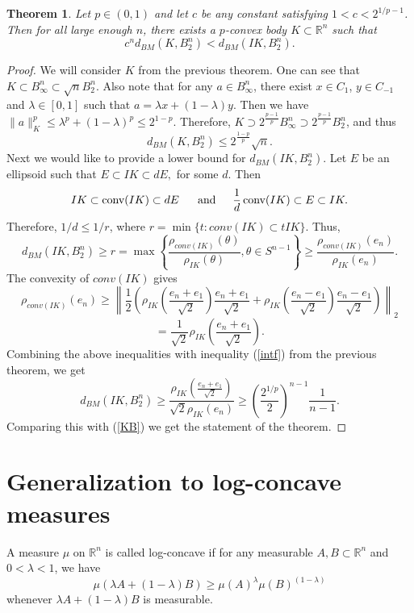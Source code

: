 \documentclass[12pt]{amsart} %
\newtheorem{theorem}{Theorem}
\renewcommand{\[}{\left[}
\renewcommand{\(}{\left(}
\renewcommand{\]}{\right]}
\renewcommand{\)}{\right)}
\newcommand{\conv}{\mathop{\textup{conv}}}
\renewcommand{\le}{\leqslant}
\renewcommand{\ge}{\geqslant}
\begin{document}
\begin{theorem}
Let $p\in (0,1)$ and let $c$ be any constant satisfying $1<c< {2^{1/p-1}}$.  Then for all large enough $n$, there exists a $p$-convex body $K\subset \mathbb R^n$ such that
$$c^n d_{BM}(K, B_2^n)  <  d_{BM} (IK, B_2^n).$$

\end{theorem}
\begin{proof}  We will consider $K$ from the previous theorem.  One can see that $K \subset B_\infty ^n \subset \sqrt{n}B_2^n$. Also note that for any $a \in B_\infty^n$, there exist $x \in C_1$,  $y\in C_{-1}$ and $\lambda \in [0,1]$ such that $a=\lambda x + (1-\lambda)y$. Then we have
$
\|a\|^p_K \le \lambda^p+(1-\lambda)^p\le 2^{1-p}.
$
Therefore, $K \supset 2^{\frac{p-1}{p}}B_\infty^n \supset  2^{\frac{p-1}{p}}B_2^n$, and thus
\begin{equation}\label{KB}
d_{BM}(K, B_2^n) \le  2^{\frac{1-p}{p}} \sqrt{n}.
\end{equation}
Next we would like to provide a lower bound for  $d_{BM}(IK, B_2^n)$.  Let
$E$ be an ellipsoid such that
$
E \subset IK \subset d E,
$ for some $d$.
Then
$$
IK \subset \conv(IK) \subset d E  \,\,\,\,\,\,\  \mbox{  and   }\,\,\,\,\,\,\, \frac{1}{d}\conv(IK) \subset E \subset IK.
$$
Therefore,  $1/d \le 1/r$, where $r=\min \{ t:  conv(IK) \subset  t IK\}$.   Thus, $$d_{BM}(IK, B_2^n) \ge r=\max\left\{\frac{\rho_{conv(IK)}(\theta)}{\rho_{IK}(\theta)},  \theta \in S^{n-1}\right\} \ge  \frac{\rho_{conv(IK)}(e_n)}{\rho_{IK}(e_n)}.$$
The  convexity of $conv(IK)$ gives
$$
\rho_{conv(IK)}(e_n) \ge  \left\| \frac{1}{2} \left  (\rho_{IK}\left(\frac{e_n+e_1}{\sqrt{2}}\right) \frac{e_n+e_1}{\sqrt{2}}+ \rho_{IK}\left(\frac{e_n-e_1}{\sqrt{2}}\right)\frac{e_n-e_1}{\sqrt{2}}\right)\right\|_2$$
$$
= \frac{1}{\sqrt{2}} \rho_{IK}\left(\frac{e_n+e_1}{\sqrt{2}}\right) .
$$
Combining  the above inequalities   with  inequality (\ref{intf}) from the previous theorem, we get
$$
d_{BM}(IK, B_2^n) \ge \frac{\rho_{IK}(\frac{e_n+e_1}{\sqrt{2}})} {\sqrt{2}\rho_{IK}(e_n)} \ge \left(\frac{2^{1/p}}{2}\right)^{n-1} \frac{1}{n-1}.    $$  Comparing this with (\ref{KB}) we get the statement of the theorem.
\end{proof}



\section{Generalization to log-concave measures}


A measure $\mu$ on $\mathbb R^n$ is called log-concave if for any measurable $A,B \subset \mathbb R^n$
and $0 < \lambda < 1$, we have
$$
\mu(\lambda A + (1-\lambda)B) \ge  \mu(A)^\lambda \mu(B)^{(1-\lambda)}
$$
whenever $\lambda A + (1-\lambda)B$ is measurable.
\end{document}
